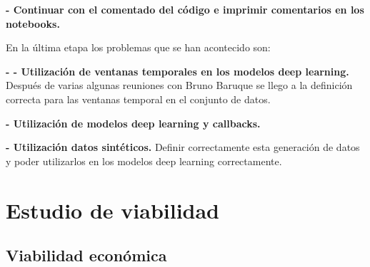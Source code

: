 \textbf{- Continuar con el comentado del código e imprimir comentarios en los notebooks.}


En la última etapa los problemas que se han acontecido son:

\textbf{- - Utilización de ventanas temporales en los modelos deep learning.} Después de varias algunas reuniones con Bruno Baruque se llego a la definición correcta para las ventanas temporal en el conjunto de datos.

\textbf{- Utilización de modelos deep learning y callbacks.}

\textbf{- Utilización datos sintéticos.} Definir correctamente esta generación de datos y poder utilizarlos en los modelos deep learning correctamente.




\section{Estudio de viabilidad}


\subsection{Viabilidad económica}

